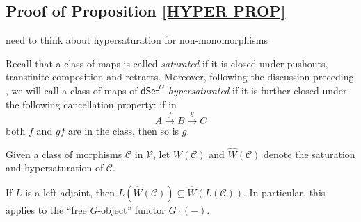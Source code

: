 \documentclass[a4paper,10pt,draft]{article}%
\begin{document}
\subsection{Proof of Proposition \ref{HYPER PROP}}


{\color{red} need to think about hypersaturation for non-monomorphisms}

Recall that a class of maps is called \textit{saturated}
if it is closed under pushouts, transfinite composition and retracts.
Moreover, following the discussion preceding \cite[Prop. 3.6.8]{HHM16}, we will call a class of maps of $\mathsf{dSet}^G$ \textit{hypersaturated} if it is further closed under the following cancellation property: if in
\[
A \xrightarrow{f} B \xrightarrow{g} C
\]
both $f$ and $gf$ are in the class, then so is $g$.

\begin{notation}
      Given a class of morphisms $\mathcal{C}$ in $\mathcal V$, let
      $W(\mathcal C)$ and $\hat{W}(\mathcal C)$ denote
      the saturation and hypersaturation of $\mathcal C$.
\end{notation}

\begin{remark}
      If $L$ is a left adjoint, then $L(\hat{W}(\mathcal C)) \subseteq \hat{W}(L(\mathcal C))$.
      In particular, this applies to the ``free $G$-object'' functor $G \cdot (-)$.
\end{remark}
\end{document}
